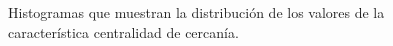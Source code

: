 \documentclass{article}
\begin{document}
\begin{figure}[htbp]

\caption{Histogramas que muestran la distribución de los valores de la característica centralidad de cercanía. }
\label{fig9} 
\end{figure}
\end{document}
